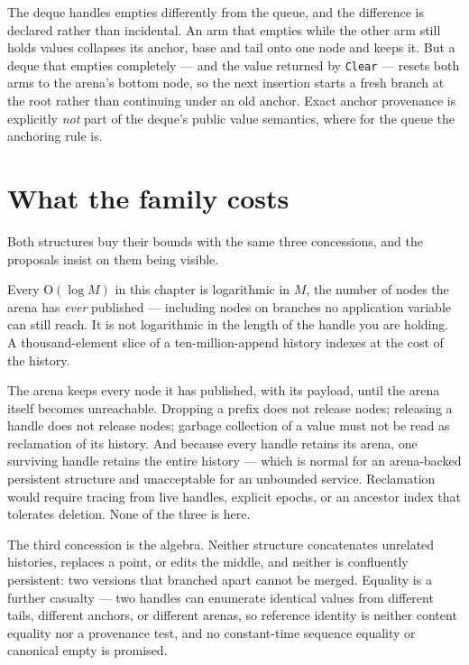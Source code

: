 \documentclass[11pt,twoside,openright]{book}
\newcommand{\code}[1]{\texorpdfstring{\textcolor{d7ink}{\texttt{#1}}}{#1}}
\newcommand{\bigoh}[1]{$\mathrm{O}(#1)$}
\begin{document}
\noindent
The deque handles empties differently from the queue, and the difference is
declared rather than incidental. An arm that empties while the other arm still
holds values collapses its anchor, base and tail onto one node and keeps it. But
a deque that empties completely --- and the value returned by \code{Clear} ---
resets both arms to the arena's bottom node, so the next insertion starts a
fresh branch at the root rather than continuing under an old anchor. Exact
anchor provenance is explicitly \emph{not} part of the deque's public value
semantics, where for the queue the anchoring rule is.

\section{What the family costs}

Both structures buy their bounds with the same three concessions, and the
proposals insist on them being visible.

\begin{caveatbox}
Every \bigoh{\log M} in this chapter is logarithmic in $M$, the number of nodes
the arena has \emph{ever} published --- including nodes on branches no
application variable can still reach. It is not logarithmic in the length of the
handle you are holding. A thousand-element slice of a ten-million-append history
indexes at the cost of the history.
\end{caveatbox}

\begin{caveatbox}
The arena keeps every node it has published, with its payload, until the arena
itself becomes unreachable. Dropping a prefix does not release nodes; releasing
a handle does not release nodes; garbage collection of a value must not be read
as reclamation of its history. And because every handle retains its arena, one
surviving handle retains the entire history --- which is normal for an
arena-backed persistent structure and unacceptable for an unbounded service.
Reclamation would require tracing from live handles, explicit epochs, or an
ancestor index that tolerates deletion. None of the three is here.
\end{caveatbox}

The third concession is the algebra. Neither structure concatenates unrelated
histories, replaces a point, or edits the middle, and neither is confluently
persistent: two versions that branched apart cannot be merged. Equality is a
further casualty --- two handles can enumerate identical values from different
tails, different anchors, or different arenas, so reference identity is neither
content equality nor a provenance test, and no constant-time sequence equality
or canonical empty is promised.
\end{document}
